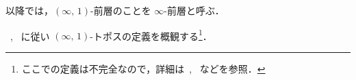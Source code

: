 \documentclass[TQFT_main]{subfiles}
\begin{document}
\begin{marker}
    以降では，$(\infty,\, 1)$-前層のことを $\infty$-前層と呼ぶ．
\end{marker}


    


~\cite{nLab}, ~\cite[p.9]{NSS2012}に従い $(\infty,\, 1)$-トポスの定義を概観する\footnote{ここでの定義は不完全なので，詳細は~\cite{nLab}, ~\cite{lurie2008higher}などを参照．}．
\end{document}
